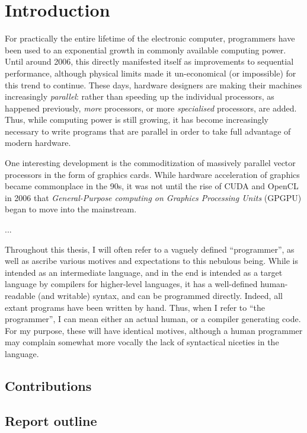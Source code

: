 \chapter{Introduction}

For practically the entire lifetime of the electronic computer,
programmers have been used to an exponential growth in commonly
available computing power.  Until around 2006, this directly
manifested itself as improvements to sequential performance, although
physical limits made it un-economical (or impossible) for this trend
to continue.  These days, hardware designers are making their machines
increasingly \textit{parallel}: rather than speeding up the individual
processors, as happened previously, \textit{more} processors, or more
\textit{specialised} processors, are added.  Thus, while computing
power is still growing, it has become increasingly necessary to write
programs that are parallel in order to take full advantage of modern
hardware.

One interesting development is the commoditization of massively
parallel vector processors in the form of graphics cards.  While
hardware acceleration of graphics became commonplace in the 90s, it
was not until the rise of CUDA and OpenCL in 2006 that
\textit{General-Purpose computing on Graphics Processing Units}
(GPGPU) began to move into the mainstream.

... 

Throughout this thesis, I will often refer to a vaguely defined
``programmer'', as well as ascribe various motives and expectations to
this nebulous being.  While \LO{} is intended as an intermediate
language, and in the end is intended as a target language by compilers
for higher-level languages, it has a well-defined human-readable (and
writable) syntax, and can be programmed directly.  Indeed, all extant
\LO{} programs have been written by hand.  Thus, when I refer to ``the
programmer'', I can mean either an actual human, or a compiler
generating \LO{} code.  For my purpose, these will have identical
motives, although a human programmer may complain somewhat more
vocally the lack of syntactical niceties in the language.

\section{Contributions}


\section{Report outline}

